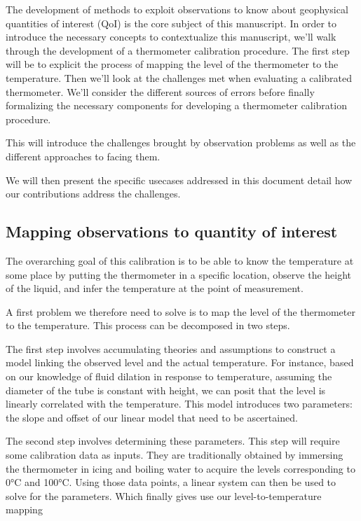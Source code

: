 \begin{bibunit}
  The development of methods to exploit observations to know about geophysical quantities of interest (QoI) is the core subject of this manuscript. 
  In order to introduce the necessary concepts to contextualize this manuscript, we'll walk through the development of a thermometer calibration procedure. The first step will be to explicit the process of mapping the level of the thermometer to the temperature. Then we'll look at the challenges met when evaluating a calibrated thermometer. We'll consider the different sources of errors before finally formalizing the necessary components for developing a thermometer calibration procedure.

  This will introduce the challenges brought by observation problems as well as the different approaches to facing them.

  We will then present the specific usecases addressed in this document detail how our contributions address the challenges.


\subsection{Mapping observations to quantity of interest}

The overarching goal of this calibration is to be able to know the temperature at some place by putting the thermometer in a specific location, observe the height of the liquid, and infer the temperature at the point of measurement.

A first problem we therefore need to solve is to map the level of the thermometer to the temperature.
  This process can be decomposed in two steps.

The first step involves accumulating theories and assumptions to construct a model linking the observed level and the actual temperature. For instance, based on our knowledge of fluid dilation in response to temperature, assuming the diameter of the tube is constant with height, we can posit that the level is linearly correlated with the temperature. This model introduces two parameters: the slope and offset of our linear model that need to be ascertained.

The second step involves determining these parameters. This step will require some calibration data as inputs. They are traditionally obtained by immersing the thermometer in icing and boiling water to acquire the levels corresponding to 0°C and 100°C.
  Using those data points, a linear system can then be used to solve for the parameters. Which finally gives use our level-to-temperature mapping




\end{bibunit}
